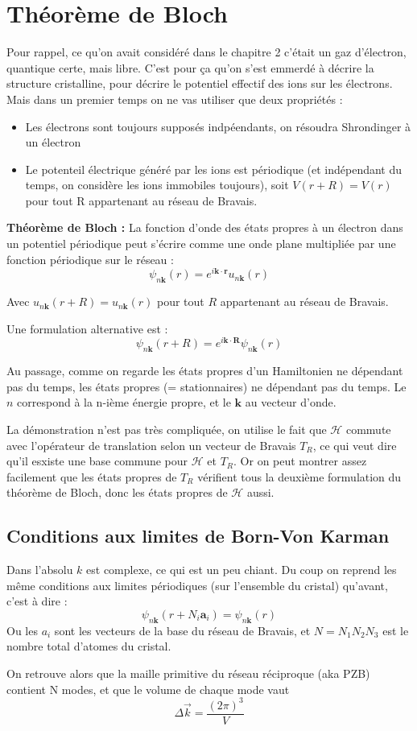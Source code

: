 \documentclass[a4paper]{report}
\begin{document}
 \section{Théorème de Bloch}
 Pour rappel, ce qu'on avait considéré dans le chapitre 2 c'était un gaz d'électron, quantique certe, mais libre. C'est pour ça qu'on s'est emmerdé à décrire la structure cristalline, pour décrire le potentiel effectif des ions sur les électrons. Mais dans un premier temps on ne vas utiliser que deux propriétés :
 \begin{itemize}
 \item Les électrons sont toujours supposés indpéendants, on résoudra Shrondinger à un électron
 \item Le potenteil électrique généré par les ions est périodique (et indépendant du temps, on considère les ions immobiles toujours), soit $ V(r+R)=V(r) $ pour tout R appartenant au réseau de Bravais.
 \end{itemize}
 \begin{tcolorbox}
 \textbf{Théorème de Bloch :} La fonction d'onde des états propres à un électron dans un potentiel périodique peut s'écrire comme une onde plane multipliée par une fonction périodique sur le réseau : $$\psi_{n\mathbf{k}}(r) = e^{i\mathbf{k}\cdot\mathbf{r}} u_{n\mathbf{k}}(r) $$
 
 Avec $u_{n\mathbf{k}}(r+R)=u_{n\mathbf{k}}(r)$ pour tout $R$ appartenant au réseau de Bravais.
 
 Une formulation alternative est : $$ \psi_{n\mathbf{k}}(r+R) = e^{i\mathbf{k}\cdot\mathbf{R}} \psi_{n\mathbf{k}}(r)$$
 \end{tcolorbox}
 Au passage, comme on regarde les états propres d'un Hamiltonien ne dépendant pas du temps, les états propres (= stationnaires) ne dépendant pas du temps. Le $n$ correspond à la n-ième énergie propre, et le $\mathbf{k}$ au vecteur d'onde.
 
 La démonstration n'est pas très compliquée, on utilise le fait que $\mathcal{H}$ commute avec l'opérateur de translation selon un vecteur de Bravais $T_R$, ce qui veut dire qu'il esxiste une base commune pour $\mathcal{H}$ et $T_R$. Or on peut montrer assez facilement que les états propres de $T_R$ vérifient tous la deuxième formulation du théorème de Bloch, donc les états propres de $\mathcal{H}$ aussi.
 
 \subsection{Conditions aux limites de Born-Von Karman}
 Dans l'absolu $k$ est complexe, ce qui est un peu chiant. Du coup on reprend les même conditions aux limites périodiques (sur l'ensemble du cristal) qu'avant, c'est à dire : $$ \psi_{n\mathbf{k}}(r+N_i \mathbf{a}_i) = \psi_{n\mathbf{k}}(r)$$ Ou les $a_i$ sont les vecteurs de la base du réseau de Bravais, et $N=N_1N_2N_3$ est le nombre total d'atomes du cristal.
 
 On retrouve alors que la maille primitive du réseau réciproque (aka PZB) contient N modes, et que le volume de chaque mode vaut $$ \Delta \vec k = \frac{(2\pi)^3}{V} $$
    
\end{document}
